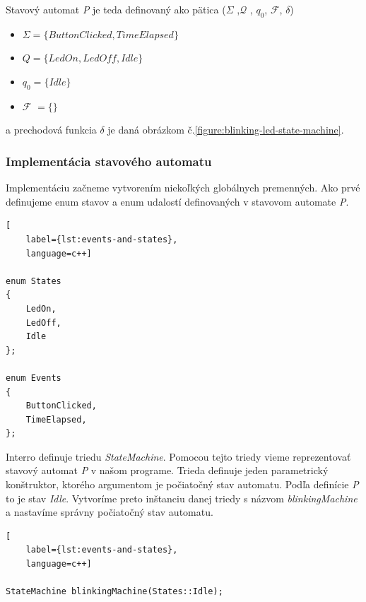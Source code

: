Stavový automat \textit{P} je teda definovaný ako pätica ($\Sigma$ ,$\mathcal{Q}$ , $q_0$, $\mathcal{F}$, $\delta$)
\begin{itemize}
    \item \begin{math} \Sigma = \{ \textit{ButtonClicked}, \textit{TimeElapsed} \}  \end{math}
    \item \begin{math} Q = \{ \textit{LedOn}, \textit{LedOff}, \textit{Idle} \}  \end{math}
    \item \begin{math} q_0 = \{ \textit{Idle} \}  \end{math}
    \item $\mathcal{F}$ \begin{math} = \{ \}  \end{math}
\end{itemize}
a prechodová funkcia $\delta$ je daná obrázkom č.\ref{figure:blinking-led-state-machine}.

\subsubsection{Implementácia stavového automatu}
\noindent \par
Implementáciu začneme vytvorením niekoľkých globálnych premenných. Ako prvé definujeme enum stavov a enum udalostí definovaných v stavovom automate \textit{P}.
\begin{lstlisting}[
    label={lst:events-and-states},
    language=c++]  

enum States
{
    LedOn,
    LedOff,
    Idle
};

enum Events
{
    ButtonClicked,
    TimeElapsed,
};    

\end{lstlisting}
Interro definuje triedu \textit{StateMachine}. Pomocou tejto triedy vieme reprezentovať stavový automat \textit{P} v našom programe. Trieda definuje jeden
parametrický konštruktor, ktorého argumentom je počiatočný stav automatu. Podľa definície \textit{P} to je stav \textit{Idle}. Vytvoríme preto inštanciu danej triedy s
názvom \textit{blinkingMachine} a nastavíme správny počiatočný stav automatu.
\begin{lstlisting}[
    label={lst:events-and-states},
    language=c++]  

StateMachine blinkingMachine(States::Idle);

\end{lstlisting}

